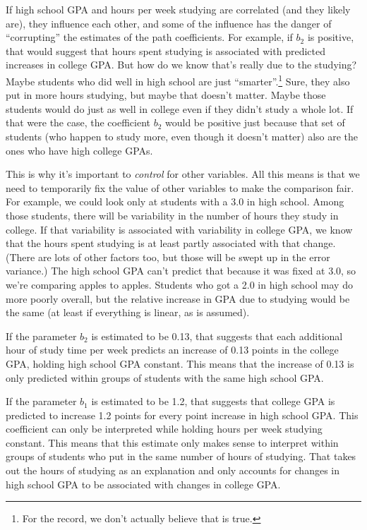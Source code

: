 \documentclass[
]{book}
\begin{document}
If high school GPA and hours per week studying are correlated (and they likely are), they influence each other, and some of the influence has the danger of ``corrupting'' the estimates of the path coefficients. For example, if \(b_{2}\) is positive, that would suggest that hours spent studying is associated with predicted increases in college GPA. But how do we know that's really due to the studying? Maybe students who did well in high school are just ``smarter''.\footnote{For the record, we don't actually believe that is true.} Sure, they also put in more hours studying, but maybe that doesn't matter. Maybe those students would do just as well in college even if they didn't study a whole lot. If that were the case, the coefficient \(b_{2}\) would be positive just because that set of students (who happen to study more, even though it doesn't matter) also are the ones who have high college GPAs.

This is why it's important to \emph{control} for other variables. All this means is that we need to temporarily fix the value of other variables to make the comparison fair. For example, we could look only at students with a 3.0 in high school. Among those students, there will be variability in the number of hours they study in college. If that variability is associated with variability in college GPA, we know that the hours spent studying is at least partly associated with that change. (There are lots of other factors too, but those will be swept up in the error variance.) The high school GPA can't predict that because it was fixed at 3.0, so we're comparing apples to apples. Students who got a 2.0 in high school may do more poorly overall, but the relative increase in GPA due to studying would be the same (at least if everything is linear, as is assumed).

If the parameter \(b_{2}\) is estimated to be 0.13, that suggests that each additional hour of study time per week predicts an increase of 0.13 points in the college GPA, holding high school GPA constant. This means that the increase of 0.13 is only predicted within groups of students with the same high school GPA.

If the parameter \(b_{1}\) is estimated to be 1.2, that suggests that college GPA is predicted to increase 1.2 points for every point increase in high school GPA. This coefficient can only be interpreted while holding hours per week studying constant. This means that this estimate only makes sense to interpret within groups of students who put in the same number of hours of studying. That takes out the hours of studying as an explanation and only accounts for changes in high school GPA to be associated with changes in college GPA.
\end{document}
